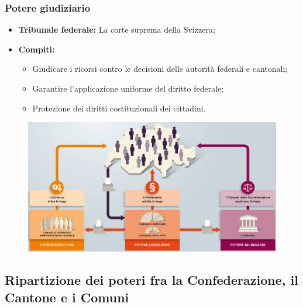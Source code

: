 \documentclass{article}
\begin{document}
\subsubsection{Potere giudiziario}
\begin{itemize}
    \item \textbf{Tribunale federale:} La corte suprema della Svizzera;
    \item \textbf{Compiti:}
        \begin{itemize}
            \item Giudicare i ricorsi contro le decisioni delle autorità federali e cantonali;
            \item Garantire l'applicazione uniforme del diritto federale;
            \item Protezione dei diritti costituzionali dei cittadini.
        \end{itemize}
\end{itemize}

\begin{figure}[ht!]
    \begin{center}
        \includegraphics[width=\textwidth]{media/geo_civica/separazione_poteri_ch.png}
    \end{center}
\end{figure}

\subsection{Ripartizione dei poteri fra la Confederazione, il Cantone e i Comuni}
\end{document}
